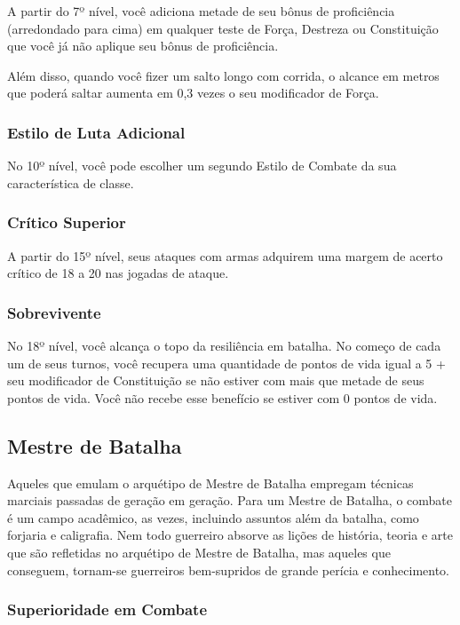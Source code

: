 \begin{multicols}{2}
A partir do 7º nível, você adiciona metade de seu bônus de proficiência
(arredondado para cima) em qualquer teste de Força, Destreza ou Constituição que
você já não aplique seu bônus de proficiência.

Além disso, quando você fizer um salto longo com corrida, o alcance em metros
que poderá saltar aumenta em 0,3 vezes o seu modificador de Força.

\subsubsection{Estilo de Luta Adicional}%

No 10º nível, você pode escolher um segundo Estilo de Combate da sua
característica de classe.

\subsubsection{Crítico Superior}%

A partir do 15º nível, seus ataques com armas adquirem uma margem de acerto
crítico de 18 a 20 nas jogadas de ataque.

\subsubsection{Sobrevivente}%

No 18º nível, você alcança o topo da resiliência em batalha. No começo de cada
um de seus turnos, você recupera uma quantidade de pontos de vida igual a 5 +
seu modificador de Constituição se não estiver com mais que metade de seus
pontos de vida. Você não recebe esse benefício se estiver com 0 pontos de vida.

\subsection*{Mestre de Batalha}%

Aqueles que emulam o arquétipo de Mestre de Batalha empregam técnicas marciais
passadas de geração em geração. Para um Mestre de Batalha, o combate é um campo
acadêmico, as vezes, incluindo assuntos além da batalha, como forjaria e
caligrafia. Nem todo guerreiro absorve as lições de história, teoria e arte que
são refletidas no arquétipo de Mestre de Batalha, mas aqueles que conseguem,
tornam-se guerreiros bem-supridos de grande perícia e conhecimento.

\subsubsection{Superioridade em Combate}%


\end{multicols}
